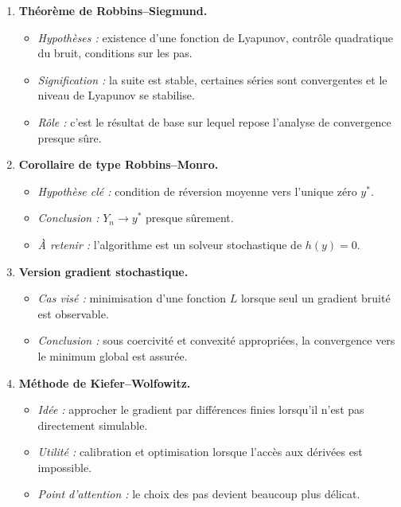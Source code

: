 \documentclass[11pt,a4paper]{article}
\begin{document}
\begin{enumerate}[label=\textbf{\arabic*.}]
  \item \textbf{Théorème de Robbins--Siegmund.}
  \begin{itemize}
    \item \emph{Hypothèses :} existence d'une fonction de Lyapunov, contrôle quadratique du bruit, conditions sur les pas.
    \item \emph{Signification :} la suite est stable, certaines séries sont convergentes et le niveau de Lyapunov se stabilise.
    \item \emph{Rôle :} c'est le résultat de base sur lequel repose l'analyse de convergence presque sûre.
  \end{itemize}

  \item \textbf{Corollaire de type Robbins--Monro.}
  \begin{itemize}
    \item \emph{Hypothèse clé :} condition de réversion moyenne vers l'unique zéro $y^\ast$.
    \item \emph{Conclusion :} $Y_n\to y^\ast$ presque sûrement.
    \item \emph{À retenir :} l'algorithme est un solveur stochastique de $h(y)=0$.
  \end{itemize}

  \item \textbf{Version gradient stochastique.}
  \begin{itemize}
    \item \emph{Cas visé :} minimisation d'une fonction $L$ lorsque seul un gradient bruité est observable.
    \item \emph{Conclusion :} sous coercivité et convexité appropriées, la convergence vers le minimum global est assurée.
  \end{itemize}

  \item \textbf{Méthode de Kiefer--Wolfowitz.}
  \begin{itemize}
    \item \emph{Idée :} approcher le gradient par différences finies lorsqu'il n'est pas directement simulable.
    \item \emph{Utilité :} calibration et optimisation lorsque l'accès aux dérivées est impossible.
    \item \emph{Point d'attention :} le choix des pas devient beaucoup plus délicat.
  \end{itemize}


\end{enumerate}
\end{document}
